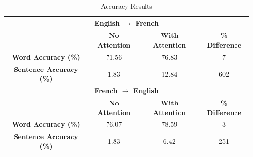 \documentclass{article}
\begin{document}
\begin{table}[h]
    \begin{tabular}{|c|c|c|c|}
        \hline
        \multicolumn{4}{|c|}{\textbf{English $\rightarrow$ French}} \\
        \hline
        \hline
        & \textbf{No Attention} & \textbf{With Attention} & \textbf{\% Difference} \\        
        \hline
        \textbf{Word Accuracy (\%)} & 71.56 & 76.83 & 7 \\
        \hline
        \textbf{Sentence Accuracy (\%)} & 1.83 & 12.84 & 602 \\
        \hline
        \multicolumn{4}{|c|}{\textbf{French $\rightarrow$ English}} \\
        \hline
        \hline
        & \textbf{No Attention} & \textbf{With Attention} & \textbf{\% Difference} \\
        \hline
        \textbf{Word Accuracy (\%)} & 76.07 & 78.59 & 3 \\
        \hline
        \textbf{Sentence Accuracy (\%)} & 1.83 & 6.42 & 251 \\
        \hline
    \end{tabular}
    \caption{Accuracy Results}
    \label{tab:accuracy}
\end{table}
\end{document}
